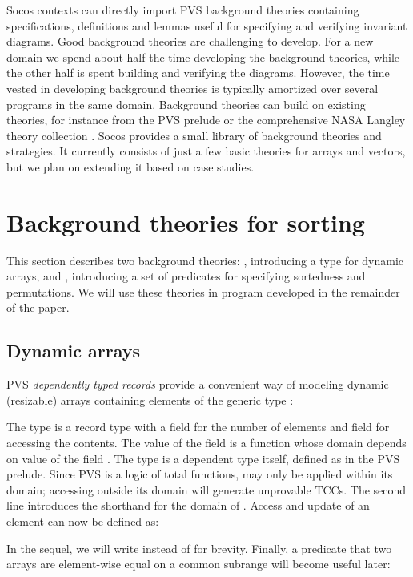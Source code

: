 \documentclass[english,submission]{eptcs}
\begin{document}
Socos contexts can directly import PVS background theories containing
specifications, definitions and lemmas useful for specifying and verifying
invariant diagrams. Good background theories are challenging to develop.
For a new domain we spend about half the time developing the background
theories, while the other half is spent building and verifying the
diagrams. However, the time vested in developing background theories
is typically amortized over several programs in the same domain. Background
theories can build on existing theories, for instance from the PVS
prelude or the comprehensive NASA Langley theory collection \cite{NASALIBS}.
Socos provides a small library of background theories and strategies.
It currently consists of just a few basic theories for arrays and
vectors, but we plan on extending it based on case studies.


\section{Background theories for sorting\label{sec:Background-theories}}

This section describes two background theories: ,
introducing a type for dynamic arrays, and , introducing
a set of predicates for specifying sortedness and permutations. We
will use these theories in program developed in the remainder of the
paper.


\subsection{Dynamic arrays}

PVS\emph{ dependently typed records} provide a convenient way of modeling
dynamic (resizable) arrays containing elements of the generic type
:
\begin{quote}

\end{quote}
\noindent The  type is a record type with a field
 for the number of elements and field 
for accessing the contents. The value of the field 
is a function whose domain depends on value of the field .
The type  is a dependent type itself, defined as
 in the
PVS prelude. Since PVS is a logic of total functions, 
may only be applied within its domain; accessing 
outside its domain will generate unprovable TCCs. The second line
introduces the shorthand  for the domain of .
Access and update of an element can now be defined as:
\begin{quote}

\end{quote}
In the sequel, we will write  instead of 
for brevity. Finally, a predicate that two arrays are element-wise
equal on a common subrange will become useful later:
\begin{quote}

\end{quote}
\end{document}
